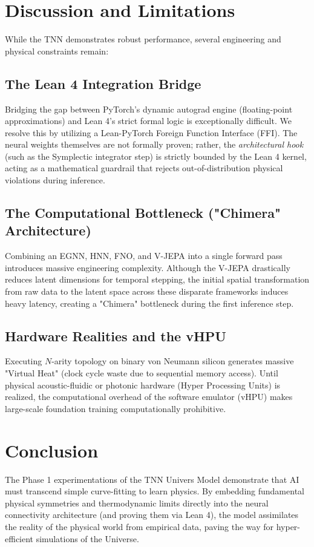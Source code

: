 \documentclass[11pt,a4paper]{article}
\begin{document}
\section{Discussion and Limitations}
While the TNN demonstrates robust performance, several engineering and physical constraints remain:

\subsection{The Lean 4 Integration Bridge}
Bridging the gap between PyTorch's dynamic autograd engine (floating-point approximations) and Lean 4's strict formal logic is exceptionally difficult. We resolve this by utilizing a Lean-PyTorch Foreign Function Interface (FFI). The neural weights themselves are not formally proven; rather, the \textit{architectural hook} (such as the Symplectic integrator step) is strictly bounded by the Lean 4 kernel, acting as a mathematical guardrail that rejects out-of-distribution physical violations during inference.

\subsection{The Computational Bottleneck ("Chimera" Architecture)}
Combining an EGNN, HNN, FNO, and V-JEPA into a single forward pass introduces massive engineering complexity. Although the V-JEPA drastically reduces latent dimensions for temporal stepping, the initial spatial transformation from raw data to the latent space across these disparate frameworks induces heavy latency, creating a "Chimera" bottleneck during the first inference step.

\subsection{Hardware Realities and the vHPU}
Executing $N$-arity topology on binary von Neumann silicon generates massive "Virtual Heat" (clock cycle waste due to sequential memory access). Until physical acoustic-fluidic or photonic hardware (Hyper Processing Units) is realized, the computational overhead of the software emulator (vHPU) makes large-scale foundation training computationally prohibitive.

\section{Conclusion}
The Phase 1 experimentations of the TNN Univers Model demonstrate that AI must transcend simple curve-fitting to learn physics. By embedding fundamental physical symmetries and thermodynamic limits directly into the neural connectivity architecture (and proving them via Lean 4), the model assimilates the reality of the physical world from empirical data, paving the way for hyper-efficient simulations of the Universe.
\end{document}
